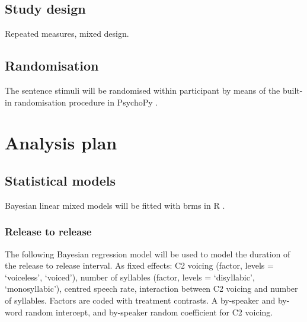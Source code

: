 \documentclass[11pt,]{article}
\begin{document}
\hypertarget{study-design}{%
\subsection{Study design}\label{study-design}}

Repeated measures, mixed design.

\hypertarget{randomisation}{%
\subsection{Randomisation}\label{randomisation}}

The sentence stimuli will be randomised within participant by means of
the built-in randomisation procedure in PsychoPy \citep{peirce2009}.

\hypertarget{analysis-plan}{%
\section{Analysis plan}\label{analysis-plan}}

\hypertarget{statistical-models}{%
\subsection{Statistical models}\label{statistical-models}}

\label{s:stats}

Bayesian linear mixed models
\citep{vasishth2018, mcelreath2015, kruschke2015} will be fitted with
brms \citep{burkner2017, burkner2018} in R \citep{r-core-team2018}.

\hypertarget{release-to-release}{%
\subsubsection{Release to release}\label{release-to-release}}

The following Bayesian regression model will be used to model the
duration of the release to release interval. As fixed effects: C2
voicing (factor, levels = `voiceless', `voiced'), number of syllables
(factor, levels = `disyllabic', `monosyllabic'), centred speech rate,
interaction between C2 voicing and number of syllables. Factors are
coded with treatment contrasts. A by-speaker and by-word random
intercept, and by-speaker random coefficient for C2 voicing.
\end{document}
